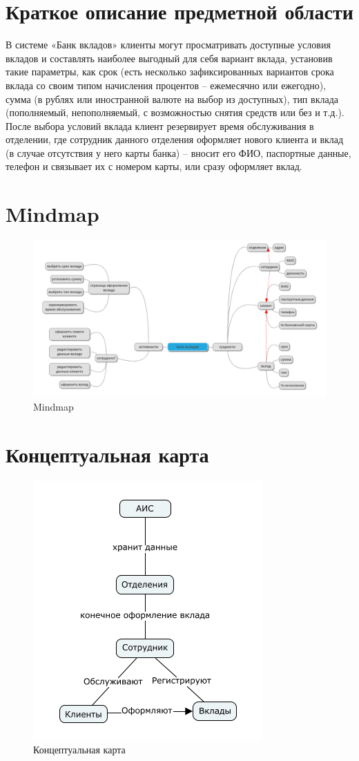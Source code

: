 \documentclass{article}
\begin{document}
\section{Краткое описание предметной области}
В системе «Банк вкладов» клиенты могут просматривать доступные условия вкладов и составлять наиболее выгодный для себя вариант вклада, установив такие параметры, как срок (есть несколько зафиксированных вариантов срока вклада со своим типом начисления процентов – ежемесячно или ежегодно), сумма (в рублях или иностранной валюте на выбор из доступных), тип вклада (пополняемый, непополняемый, с возможностью снятия средств или без и т.д.). После выбора условий вклада клиент резервирует время обслуживания в отделении, где сотрудник данного отделения оформляет нового клиента и вклад (в случае отсутствия у него карты банка) – вносит его ФИО, паспортные данные, телефон и связывает их с номером карты, или сразу оформляет вклад.

\newpage
\section{Mindmap}
\begin{figure}[!h]
    \centering
    \includegraphics[width=\textwidth]{mindmap.png}
    \caption{Mindmap}
\end{figure}

\newpage
\section{Концептуальная карта}
\begin{figure}[!h]
    \centering
    \includegraphics{concept_map.png}
    \caption{Концептуальная карта}
\end{figure}
\end{document}
